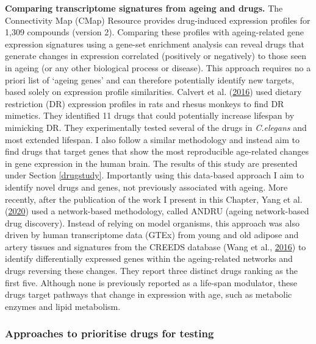 \documentclass[12pt,twoside]{unicam}
\begin{document}
\textbf{Comparing transcriptome signatures from ageing and drugs.} The Connectivity Map (CMap) Resource provides drug-induced expression profiles for 1,309 compounds (version 2). Comparing these profiles with ageing-related gene expression signatures using a gene-set enrichment analysis can reveal drugs that generate changes in expression correlated (positively or negatively) to those seen in ageing (or any other biological process or disease). This approach requires no a priori list of `ageing genes' and can therefore potentially identify new targets, based solely on expression profile similarities. Calvert et al. (\protect\hyperlink{ref-Calvert2016}{2016}) used dietary restriction (DR) expression profiles in rats and rhesus monkeys to find DR mimetics. They identified 11 drugs that could potentially increase lifespan by mimicking DR. They experimentally tested several of the drugs in \emph{C.elegans} and most extended lifespan. I also follow a similar methodology and instead aim to find drugs that target genes that show the most reproducible age-related changes in gene expression in the human brain. The results of this study are presented under Section \ref{drugstudy}. Importantly using this data-based approach I aim to identify novel drugs and genes, not previously associated with ageing. More recently, after the publication of the work I present in this Chapter, Yang et al. (\protect\hyperlink{ref-Yang2018}{2020}) used a network-based methodology, called ANDRU (ageing network-based drug discovery). Instead of relying on model organisms, this approach was also driven by human transcriptome data (GTEx) from young and old adipose and artery tissues and signatures from the CREEDS database (Wang et al., \protect\hyperlink{ref-Wang2016}{2016}) to identify differentially expressed genes within the ageing-related networks and drugs reversing these changes. They report three distinct drugs ranking as the first five. Although none is previously reported as a life-span modulator, these drugs target pathways that change in expression with age, such as metabolic enzymes and lipid metabolism.

\hypertarget{approaches-to-prioritise-drugs-for-testing}{%
\subsubsection{Approaches to prioritise drugs for testing}\label{approaches-to-prioritise-drugs-for-testing}}
\end{document}
